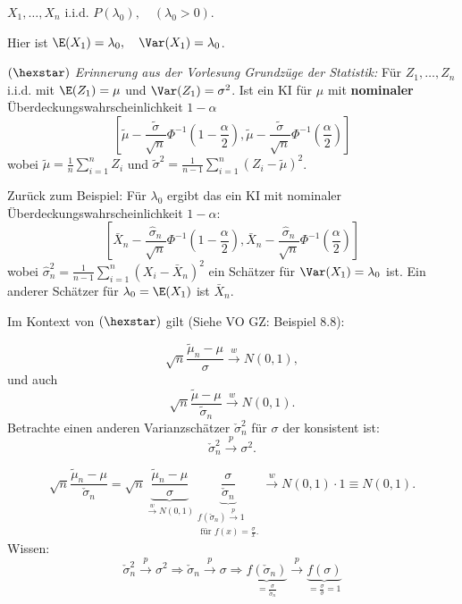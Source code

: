 \documentclass{tstextbook}
\begin{document}
\begin{example}
	$ X_1,\ldots,X_n $ i.i.d. $ P(\lambda_0), \quad (\lambda_0 > 0) $. 
	
	Hier ist $ \E(X_1)=\lambda_0, \quad \Var(X_1)=\lambda_0 $. 
	
	
	$ (\hexstar) $ \textit{Erinnerung aus der Vorlesung Grundzüge der Statistik:} 
	Für $ Z_1,\ldots, Z_n $ i.i.d. mit $ \E(Z_1) = \mu $ und $ \Var(Z_1) = \sigma^2 $. Ist ein KI für $ \mu $ mit \textbf{nominaler}  Überdeckungswahrscheinlichkeit $ 1 - \alpha $ 
	\[
	\left[\tilde{\mu} - \frac{\tilde{\sigma}}{\sqrt{n}} \Phi^{-1}\left(1-\frac{\alpha}{2}\right), \tilde{\mu} - \frac{\tilde{\sigma}}{\sqrt{n}} \Phi^{-1}\left(\frac{\alpha}{2}\right) \right]
	\]
	wobei $ \tilde{\mu}= \frac{1}{n}\sum_{i=1}^{n} Z_i $ und $ \tilde{\sigma}^2 = \frac{1}{n-1} \sum_{i=1}^{n} (Z_i - \tilde{\mu})^2 $.
	
	Zurück zum Beispiel: Für $ \lambda_0 $ ergibt das ein KI mit nominaler Überdeckungswahrscheinlichkeit $ 1 - \alpha $: 
	\[
	\left[\bar{X}_n - \frac{\hat{\sigma}_n}{\sqrt{n}} \Phi^{-1}\left(1-\frac{\alpha}{2}\right), \bar{X}_n - \frac{\hat{\sigma}_n}{\sqrt{n}} \Phi^{-1}\left(\frac{\alpha}{2}\right) \right]
	\]
	wobei $ \hat{\sigma}_n^2 = \frac{1}{n-1} \sum_{i=1}^{n} (X_i - \bar{X}_n)^2 $ ein Schätzer für $ \Var(X_1) = \lambda_0 $ ist. Ein anderer Schätzer für $ \lambda_0 = \E(X_1) $ ist $ \bar{X}_n $.
	
	
	Im Kontext von $ (\hexstar) $ gilt (Siehe VO GZ: Beispiel 8.8): 
	
	\[
	\sqrt{n} \frac{\tilde{\mu}_n-\mu}{\sigma} \overset{w}{\longrightarrow} N(0,1), 
	\] und auch
	\[
	\sqrt{n} \frac{\tilde{\mu}-\mu}{\tilde{\sigma}_n} \overset{w}{\longrightarrow} N(0,1). 
	\]
	Betrachte einen anderen Varianzschätzer $ \check{\sigma}_n^2 $ für $ \sigma $ der konsistent ist: \[ \check{\sigma}_n^2 \xrightarrow{p} \sigma^2 . \]
	
	\[
	\sqrt{n} \frac{\tilde{\mu}_n - \mu}{\check{\sigma}_n} = \sqrt{n} \underbrace{\frac{\tilde{\mu}_n - \mu}{\sigma}}_{\xrightarrow{w}N(0,1)} \underbrace{\frac{\sigma}{\check{\sigma}_n}}_{\substack{ f(\check{\sigma}_n) \xrightarrow{p}1 \\ \text{ für } f(x) = \frac{\sigma}{x}.}} \xrightarrow{w} N(0,1)\cdot 1 \equiv N(0,1).
	\]
	Wissen: \[ \check{\sigma}_n^2 \xrightarrow{p} \sigma^2 \Rightarrow \check{\sigma}_n \xrightarrow{p} \sigma \Rightarrow \underbrace{f(\check{\sigma}_n)}_{=\frac{\sigma}{\check{\sigma}_n}} \xrightarrow{p} \underbrace{f(\sigma)}_{= \frac{\sigma}{\sigma}=1} \]
	

\end{example}
\end{document}
